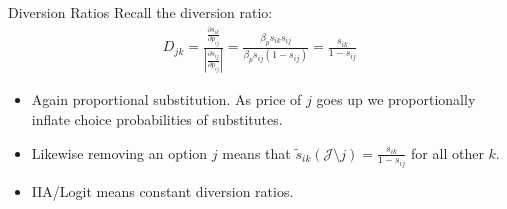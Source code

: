 \begin{frame}{Diversion Ratios}
Recall the diversion ratio:
\begin{align*}
D_{jk} =\frac{\frac{\partial s_{ik}}{\partial p_{ij}}}{\left |\frac{\partial s_{ij}}{\partial p_{ij}} \right|} = \frac{\beta_p s_{ik} s_{ij}}{\beta_p s_{ij} (1-s_{ij})} = \frac{s_{ik}}{1-s_{ij}}
\end{align*}
\begin{itemize}
\item Again proportional substitution. As price of $j$ goes up we proportionally inflate choice probabilities of substitutes.
\item Likewise removing an option $j$ means that $\tilde{s}_{ik}(\mathcal{J} \setminus j) = \frac{s_{ik}}{1-s_{ij}}$ for all other $k$.
\item IIA/Logit means \alert{constant diversion ratios}.
\end{itemize}
\end{frame}
%
%
%
%
%
%
%
